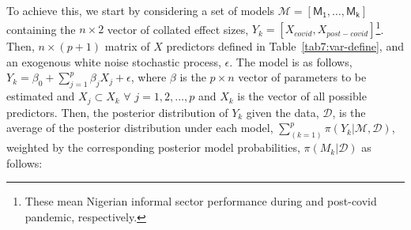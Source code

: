 \documentclass[a4paper, 12pt]{article}
\begin{document}
    \begin{table}[H]
        \centering
        \caption{Variable definition}
        \label{tab7:var-define}
    \end{table}

    To achieve this, we start by considering a set of models $\mathcal{M} = [\mathsf{M_1}, \dots, \mathsf{M_k}]$ containing the $n \times 2$ vector of collated effect sizes, $Y_k = [X_{covid}, X_{post-covid}]$\footnote{These mean Nigerian informal sector performance during and post-covid pandemic, respectively.}. Then, $n \times (p+1)$ matrix of ${X}$ predictors defined in Table~\ref{tab7:var-define}, and an exogenous white noise stochastic process, $\epsilon$. The model is as follows, $Y_k = \beta_0 + \sum_{j = 1}^{p}\beta_j X_j + \epsilon$, where $\beta$ is the $p\times n$ vector of parameters to be estimated and $\mathit{X}_j \subset \mathit{X}_k$ $\forall$ $j = 1,2, \dots, p$ and ${X_k}$ is the vector of all possible predictors. Then, the posterior distribution of $Y_k$ given the data, $\mathcal{D}$, is the average of the posterior distribution under each model, $\sum_{(k = 1)}^p \pi(Y_k | \mathcal{M}, \mathcal{D})$, weighted by the corresponding posterior model probabilities, $\pi(M_k | \mathcal{D})$ as follows:
\end{document}
